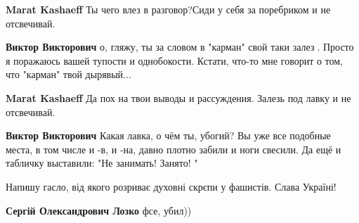 \begin{itemize}
\begin{itemize}
\textbf{Marat Kashaeff} Ты чего влез в разговор?Сиди у себя за поребриком и не отсвечивай.

 
\textbf{Виктор Викторович} о, гляжу, ты за словом в "карман" свой таки залез🤣. Просто я поражаюсь вашей тупости и однобокости. Кстати, что-то мне говорит о том, что "карман" твой дырявый...🤣

 
\textbf{Marat Kashaeff} Да пох на твои выводы и рассуждения. Залезь под лавку и не отсвечивай.

 
\textbf{Виктор Викторович} Какая лавка, о чём ты, убогий? Вы уже все подобные места, в том числе и -в, и -на, давно плотно забили и ноги свесили. Да ещё и табличку выставили: "Не занимать! Занято! "
\end{itemize}

 
Напишу гасло, від якого розриває духовні скрєпи у фашистів. Слава Україні!

\begin{itemize}
 
\textbf{Сергій Олександрович Лозко} фсе, убил))

 

\end{itemize}
\end{itemize}
